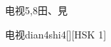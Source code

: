\begin{entry}{电视}{5,8}{⽥、⾒}
  \begin{phonetics}{电视}{dian4shi4}[][HSK 1]
  \end{phonetics}
\end{entry}
